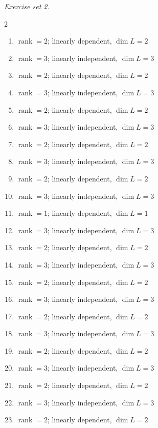 \par\noindent\emph{Exercise set 2.}\nopagebreak
\begin{multicols}{2}\raggedright
\begin{enumerate}[label=\arabic*., leftmargin=*, itemsep=1pt]
\item $\operatorname{rank}=2$; linearly dependent, $\dim L=2$
\item $\operatorname{rank}=3$; linearly independent, $\dim L=3$
\item $\operatorname{rank}=2$; linearly dependent, $\dim L=2$
\item $\operatorname{rank}=3$; linearly independent, $\dim L=3$
\item $\operatorname{rank}=2$; linearly dependent, $\dim L=2$
\item $\operatorname{rank}=3$; linearly independent, $\dim L=3$
\item $\operatorname{rank}=2$; linearly dependent, $\dim L=2$
\item $\operatorname{rank}=3$; linearly independent, $\dim L=3$
\item $\operatorname{rank}=2$; linearly dependent, $\dim L=2$
\item $\operatorname{rank}=3$; linearly independent, $\dim L=3$
\item $\operatorname{rank}=1$; linearly dependent, $\dim L=1$
\item $\operatorname{rank}=3$; linearly independent, $\dim L=3$
\item $\operatorname{rank}=2$; linearly dependent, $\dim L=2$
\item $\operatorname{rank}=3$; linearly independent, $\dim L=3$
\item $\operatorname{rank}=2$; linearly dependent, $\dim L=2$
\item $\operatorname{rank}=3$; linearly independent, $\dim L=3$
\item $\operatorname{rank}=2$; linearly dependent, $\dim L=2$
\item $\operatorname{rank}=3$; linearly independent, $\dim L=3$
\item $\operatorname{rank}=2$; linearly dependent, $\dim L=2$
\item $\operatorname{rank}=3$; linearly independent, $\dim L=3$
\item $\operatorname{rank}=2$; linearly dependent, $\dim L=2$
\item $\operatorname{rank}=3$; linearly independent, $\dim L=3$
\item $\operatorname{rank}=2$; linearly dependent, $\dim L=2$

\end{enumerate}
\end{multicols}
